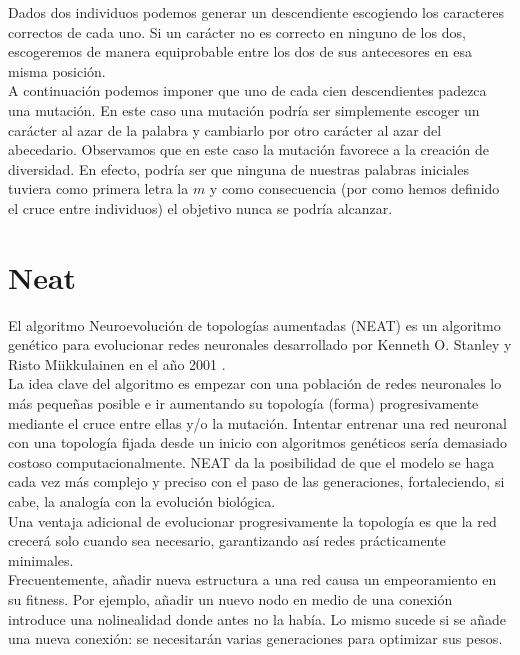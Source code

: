 \documentclass{article}
\begin{document}
Dados dos individuos podemos generar un descendiente escogiendo los caracteres correctos de cada uno. Si un carácter no es correcto en ninguno de los dos, escogeremos de manera equiprobable entre los dos de sus antecesores en esa misma posición.\\

A continuación podemos imponer que uno de cada cien descendientes padezca una mutación. En este caso una mutación podría ser simplemente escoger un carácter al azar de la palabra y cambiarlo por otro carácter al azar del abecedario. Observamos que en este caso la mutación favorece a la creación de diversidad. En efecto, podría ser que ninguna de nuestras palabras iniciales tuviera como primera letra la $m$ y como consecuencia (por como hemos definido el cruce entre individuos) el objetivo nunca se podría alcanzar.


\section{Neat}


El algoritmo Neuroevolución de topologías aumentadas (NEAT) es un algoritmo genético para evolucionar redes neuronales desarrollado por Kenneth O. Stanley y Risto Miikkulainen en el año 2001 \cite{EvolvingNeuralNetworksthroughTopologies}\cite{EfficientEvolutionofNeuralNetworkTopologies}.\\

La idea clave del algoritmo es empezar con una población de redes neuronales lo más pequeñas posible e ir aumentando su topología (forma) progresivamente mediante el cruce entre ellas y/o la mutación. Intentar entrenar una red neuronal con una topología fijada desde un inicio con algoritmos genéticos sería demasiado costoso computacionalmente. NEAT da la posibilidad de que el modelo se haga cada vez más complejo y preciso con el paso de las generaciones, fortaleciendo, si cabe, la analogía con la evolución biológica.\\

Una ventaja adicional de evolucionar progresivamente la topología es que la red crecerá solo cuando sea necesario, garantizando así redes prácticamente minimales.\\

Frecuentemente, añadir nueva estructura a una red causa un empeoramiento en su fitness. Por ejemplo, añadir un nuevo nodo en medio de una conexión introduce una nolinealidad donde antes no la había. Lo mismo sucede si se añade una nueva conexión: se necesitarán varias generaciones para optimizar sus pesos.\\
\end{document}
